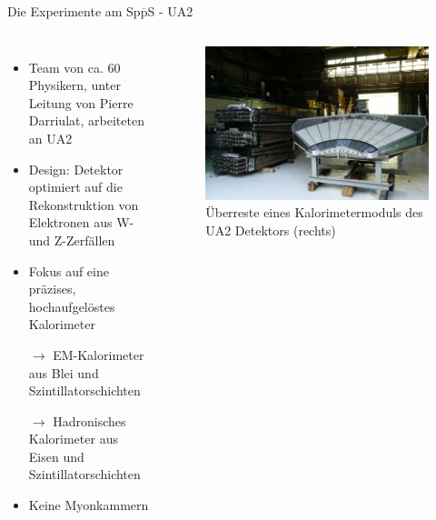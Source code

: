 \documentclass[aspectratio=1610, professionalfonts, 10pt]{beamer}
\begin{document}
\begin{frame}{Die Experimente am Sp$\overline{\text{p}}$S - UA2}
	\begin{columns}
				\begin{itemize}
					\setlength\itemsep{0.5em}
					\item Team von ca. 60 Physikern, unter Leitung von Pierre Darriulat, arbeiteten an UA2
					\item Design: Detektor optimiert auf die Rekonstruktion von Elektronen aus W- und Z-Zerfällen
					\item Fokus auf eine präzises, hochaufgelöstes Kalorimeter
					\item[$\rightarrow$] EM-Kalorimeter aus Blei und Szintillatorschichten
					\item[$\rightarrow$] Hadronisches Kalorimeter aus Eisen und Szintillatorschichten
					\item Keine Myonkammern
				\end{itemize}
			\begin{figure}
	  			\centering
				\includegraphics[width=\linewidth]{Images/Image1-Tilecal.jpg}
				\caption{Überreste eines Kalorimetermoduls des UA2 Detektors (rechts) \cite{CERN-EX-8710495}}
	  			\label{fig:sad}
			\end{figure}
	\end{columns}
\end{frame}
\end{document}
